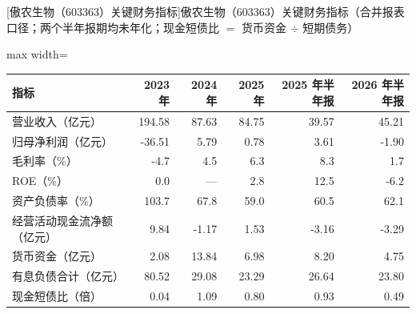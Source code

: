 \begin{center}\small\setlength{\tabcolsep}{3.4pt}
[傲农生物（603363）关键财务指标]{傲农生物（603363）关键财务指标（合并报表口径；两个半年报期均未年化；现金短债比 $=$ 货币资金 $\div$ 短期债务）}
\begin{adjustbox}{max width=\textwidth}
\begin{tabular}{@{}lrrrrr@{}}
\toprule
指标 & 2023 年 & 2024 年 & 2025 年 & 2025 年半年报 & 2026 年半年报 \\
\midrule
营业收入（亿元） & 194.58 & 87.63 & 84.75 & 39.57 & 45.21 \\
归母净利润（亿元） & -36.51 & 5.79 & 0.78 & 3.61 & -1.90 \\
毛利率（\%） & -4.7 & 4.5 & 6.3 & 8.3 & 1.7 \\
ROE（\%） & 0.0 & --- & 2.8 & 12.5 & -6.2 \\
资产负债率（\%） & 103.7 & 67.8 & 59.0 & 60.5 & 62.1 \\
经营活动现金流净额（亿元） & 9.84 & -1.17 & 1.53 & -3.16 & -3.29 \\
货币资金（亿元） & 2.08 & 13.84 & 6.98 & 8.20 & 4.75 \\
有息负债合计（亿元） & 80.52 & 29.08 & 23.29 & 26.64 & 23.80 \\
现金短债比（倍） & 0.04 & 1.09 & 0.80 & 0.93 & 0.49 \\
\bottomrule
\end{tabular}
\end{adjustbox}
\end{center}

